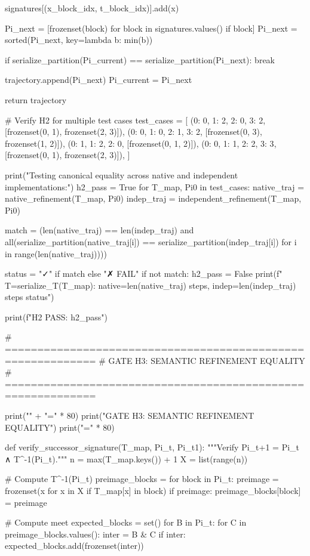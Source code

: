             signatures[(x_block_idx, t_block_idx)].add(x)
        
        Pi_next = [frozenset(block) for block in signatures.values() if block]
        Pi_next = sorted(Pi_next, key=lambda b: min(b))
        
        if serialize_partition(Pi_current) == serialize_partition(Pi_next):
            break
        
        trajectory.append(Pi_next)
        Pi_current = Pi_next
    
    return trajectory

# Verify H2 for multiple test cases
test_cases = [
    ({0: 0, 1: 2, 2: 0, 3: 2}, [frozenset({0, 1}), frozenset({2, 3})]),
    ({0: 0, 1: 0, 2: 1, 3: 2}, [frozenset({0, 3}), frozenset({1, 2})]),
    ({0: 1, 1: 2, 2: 0}, [frozenset({0, 1, 2})]),
    ({0: 0, 1: 1, 2: 2, 3: 3}, [frozenset({0, 1}), frozenset({2, 3})]),
]

print("\n  Testing canonical equality across native and independent implementations:")
h2_pass = True
for T_map, Pi0 in test_cases:
    native_traj = native_refinement(T_map, Pi0)
    indep_traj = independent_refinement(T_map, Pi0)
    
    match = (len(native_traj) == len(indep_traj) and
             all(serialize_partition(native_traj[i]) == serialize_partition(indep_traj[i])
                 for i in range(len(native_traj))))
    
    status = "✓" if match else "✗ FAIL"
    if not match:
        h2_pass = False
    print(f"    T={serialize_T(T_map)}: native={len(native_traj)} steps, indep={len(indep_traj)} steps {status}")

print(f"\n  H2 PASS: {h2_pass}")

# ============================================================
# GATE H3: SEMANTIC REFINEMENT EQUALITY
# ============================================================

print("\n" + "=" * 80)
print("GATE H3: SEMANTIC REFINEMENT EQUALITY")
print("=" * 80)

def verify_successor_signature(T_map, Pi_t, Pi_t1):
    """Verify Pi_{t+1} = Pi_t ∧ T^{-1}(Pi_t)."""
    n = max(T_map.keys()) + 1
    X = list(range(n))
    
    # Compute T^{-1}(Pi_t)
    preimage_blocks = {}
    for block in Pi_t:
        preimage = frozenset({x for x in X if T_map[x] in block})
        if preimage:
            preimage_blocks[block] = preimage
    
    # Compute meet
    expected_blocks = set()
    for B in Pi_t:
        for C in preimage_blocks.values():
            inter = B & C
            if inter:
                expected_blocks.add(frozenset(inter))
    
